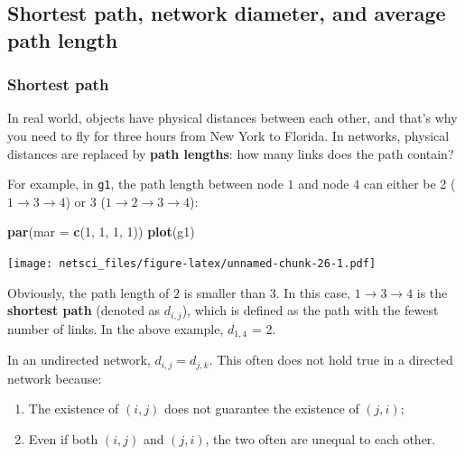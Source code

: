 \documentclass[
]{krantz}
\makeatletter
\newenvironment{Shaded}{\begin{snugshade}}{\end{snugshade}}
\newcommand{\DataTypeTok}[1]{\textcolor[rgb]{0.27,0.27,0.27}{#1}}
\newcommand{\DecValTok}[1]{\textcolor[rgb]{0.06,0.06,0.06}{#1}}
\newcommand{\KeywordTok}[1]{\textcolor[rgb]{0.27,0.27,0.27}{\textbf{#1}}}
\newcommand{\NormalTok}[1]{#1}
\newenvironment{kframe}{%
\medskip{}
\setlength{\fboxsep}{.8em}
 \def\at@end@of@kframe{}%
 \ifinner\ifhmode%
  \def\at@end@of@kframe{\end{minipage}}%
  \begin{minipage}{\columnwidth}%
 \fi\fi%
 \def\FrameCommand##1{\hskip\@totalleftmargin \hskip-\fboxsep
 \colorbox{shadecolor}{##1}\hskip-\fboxsep
     \hskip-\linewidth \hskip-\@totalleftmargin \hskip\columnwidth}%
 \MakeFramed {\advance\hsize-\width
   \@totalleftmargin\z@ \linewidth\hsize
   \@setminipage}}%
 {\par\unskip\endMakeFramed%
 \at@end@of@kframe}
\renewenvironment{Shaded}{\begin{kframe}}{\end{kframe}}
\makeatother
\begin{document}
\hypertarget{shortest-path-network-diameter-and-average-path-length}{%
\subsection{Shortest path, network diameter, and average path length}\label{shortest-path-network-diameter-and-average-path-length}}

\hypertarget{shortest-path}{%
\subsubsection{Shortest path}\label{shortest-path}}

In real world, objects have physical distances between each other, and that's why you need to fly for three hours from New York to Florida. In networks, physical distances are replaced by \textbf{path lengths}: how many links does the path contain?

For example, in \texttt{g1}, the path length between node \(1\) and node \(4\) can either be 2 (\(1 \to 3 \to 4\)) or 3 (\(1 \to 2 \to 3 \to 4\)):

\begin{Shaded}
\begin{Highlighting}[]
\KeywordTok{par}\NormalTok{(}\DataTypeTok{mar =} \KeywordTok{c}\NormalTok{(}\DecValTok{1}\NormalTok{, }\DecValTok{1}\NormalTok{, }\DecValTok{1}\NormalTok{, }\DecValTok{1}\NormalTok{))}
\KeywordTok{plot}\NormalTok{(g1)}
\end{Highlighting}
\end{Shaded}

\texttt{[image: netsci\_files/figure-latex/unnamed-chunk-26-1.pdf]}

Obviously, the path length of \(2\) is smaller than \(3\). In this case, \(1 \to 3 \to 4\) is the \textbf{shortest path} (denoted as \(d_{i,j}\)), which is defined as the path with the fewest number of links. In the above example, \(d_{1,4}\) = 2.

In an undirected network, \(d_{i,j} = d_{j,k}\). This often does not hold true in a directed network because:

\begin{enumerate}
\def\labelenumi{\arabic{enumi}.}
\item
  The existence of \((i, j)\) does not guarantee the existence of \((j, i)\);
\item
  Even if both \((i, j)\) and \((j, i)\), the two often are unequal to each other.
\end{enumerate}
\end{document}
